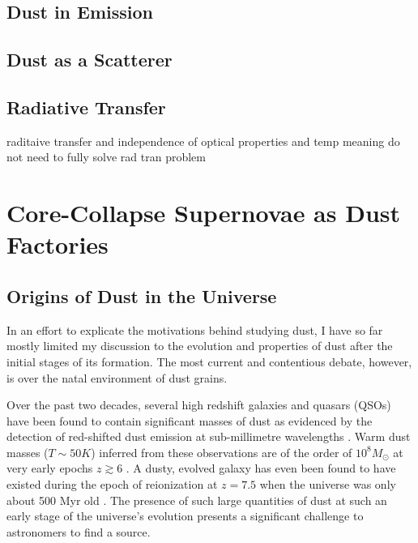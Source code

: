 \subsection{Dust in Emission}
\subsection{Dust as a Scatterer}
\subsection{Radiative Transfer}
raditaive transfer and independence of optical properties and temp meaning do not need to fully solve rad tran problem
 


\section{Core-Collapse Supernovae as Dust Factories}

\subsection{Origins of Dust in the Universe}
In an effort to explicate the motivations behind studying dust, I have so far mostly limited my discussion to the evolution and properties of dust after the initial stages of its formation.  The most current and contentious debate, however, is over the natal environment of dust grains.  

Over the past two decades, several high redshift galaxies and quasars (QSOs) have been found to contain significant masses of dust as evidenced by the detection of red-shifted dust emission at sub-millimetre wavelengths \citep{Carilli2001, Omont2001, Bertoldi2002, Bertoldi2003, Watson2015}.  Warm dust masses ($T\sim50K$) inferred from these observations are of the order of $10^8M_{\odot}$ at very early epochs $z \gtrsim 6$ \citep{Robson2004,Beelen2006,Dwek2007}.  A dusty, evolved galaxy has even been found to have existed during the epoch of reionization at $z=7.5$ when the universe was only about 500 Myr old \citep{Watson2015}.  The presence of such large quantities of dust at such an early stage of the universe's evolution presents a significant challenge to astronomers to find a source.  

